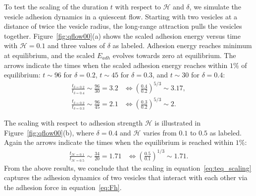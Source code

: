 \documentclass[prf,superscriptaddress,showkeys]{revtex4-1}
\begin{document}
To test the scaling of the duration $t$ with respect to $\mathcal{H}$
and $\delta$, we simulate the vesicle adhesion dynamics in a quiescent
flow.  Starting with two vesicles at a distance of twice the vesicle
radius, the long-range attraction pulls the vesicles together.
Figure~\ref{fig:qflow00}(a) shows the scaled adhesion energy versus time
with $\mathcal{H}=0.1$ and three values of $\delta$ as labeled.
Adhesion energy reaches minimum at equilibrium, and the scaled $E_{adh}$
evolves towards zero at equilibrium.  The arrows indicate the times when
the scaled adhesion energy reaches within $1\%$ of equilibrium: $t\sim
96$ for $\delta=0.2$, $t\sim 45$ for $\delta = 0.3$, and $t\sim 30$ for
$\delta=0.4$:
\begin{align*}
\frac{t_{\delta=0.2}}{t_{\delta=0.4}} \sim \frac{96}{30}=3.2 
  &\Longleftrightarrow \left(\frac{0.4}{0.2}\right)^{5/3}\sim 3.17,\\
\frac{t_{\delta=0.2}}{t_{\delta=0.3}} \sim \frac{96}{45}=2.1 
  &\Longleftrightarrow \left(\frac{0.3}{0.2}\right)^{5/3}\sim 2.
\end{align*}

The scaling with respect to adhesion strength $\mathcal{H}$ is
illustrated in Figure~\ref{fig:qflow00}(b), where $\delta = 0.4$ and
$\mathcal{H}$ varies from $0.1$ to $0.5$ as labeled.  Again the arrows
indicate the times when the equilibrium is reached within $1\%$:
\begin{align*}
  \frac{t_{\mathcal{H}=0.1}}{t_{\mathcal{H}=0.5}} \sim \frac{34}{20} = 1.71 
  &\Longleftrightarrow \left(\frac{0.5}{0.1}\right)^{1/3}\sim 1.71.
\end{align*}
From the above results, we conclude that the scaling in
equation~\eqref{eq:teq_scaling} captures the adhesion dynamics of two
vesicles that interact with each other via the adhesion force in
equation~\eqref{eq:Fh}.

\end{document}

